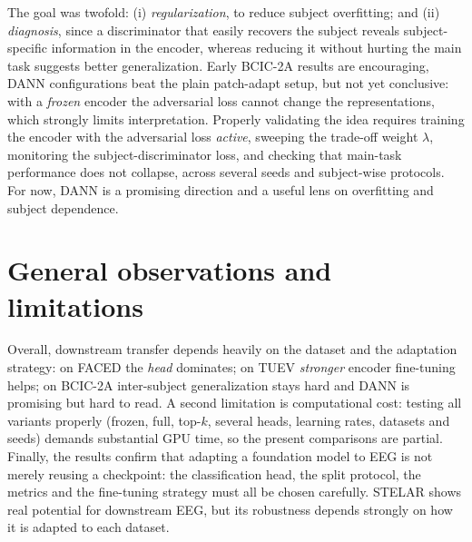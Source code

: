 \documentclass[11pt]{article}
\begin{document}
The goal was twofold: (i) \emph{regularization}, to reduce subject overfitting;
and (ii) \emph{diagnosis}, since a discriminator that easily recovers the subject
reveals subject-specific information in the encoder, whereas reducing it without
hurting the main task suggests better generalization. Early BCIC-2A results are
encouraging, DANN configurations beat the plain patch-adapt setup, but not yet
conclusive: with a \emph{frozen} encoder the adversarial loss cannot change the
representations, which strongly limits interpretation. Properly validating the
idea requires training the encoder with the adversarial loss \emph{active},
sweeping the trade-off weight $\lambda$, monitoring the subject-discriminator
loss, and checking that main-task performance does not collapse, across several
seeds and subject-wise protocols. For now, DANN is a promising direction and a
useful lens on overfitting and subject dependence.

\section{General observations and limitations}
\label{sec:observations}

Overall, downstream transfer depends heavily on the dataset and the adaptation
strategy: on FACED the \emph{head} dominates; on TUEV \emph{stronger} encoder
fine-tuning helps; on BCIC-2A inter-subject generalization stays hard and DANN is
promising but hard to read. A second limitation is computational cost: testing all
variants properly (frozen, full, top-$k$, several heads, learning rates, datasets
and seeds) demands substantial GPU time, so the present comparisons are partial.
Finally, the results confirm that adapting a foundation model to EEG is not merely
reusing a checkpoint: the classification head, the split protocol, the metrics and
the fine-tuning strategy must all be chosen carefully. STELAR shows real potential
for downstream EEG, but its robustness depends strongly on how it is adapted to
each dataset.
\end{document}
